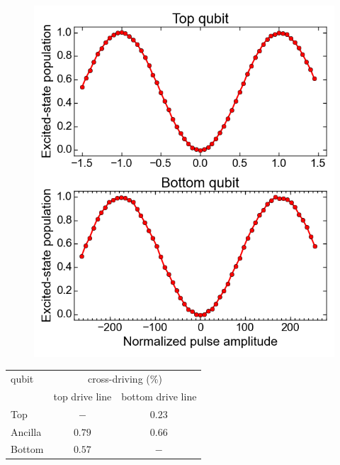       \begin{figure}[tb]
        \centering
        \includegraphics[width=.5\textwidth]{../Figures/Exploring frequency re-use/cross-driving_Rabi.png}
        \label{fig:cross-driving Rabi}
      \end{figure}
      \begin{table}
        \begin{tabular}{l c c}
          \toprule
          qubit & \multicolumn{2}{c}{cross-driving (\%)} \\
          \cmidrule(lr){2-3}
               & top drive line & bottom drive line \\
          \midrule
          Top     & $-$    & $0.23$ \\
          Ancilla & $0.79$ & $0.66$ \\
          Bottom  & $0.57$ & $-$    \\
          \bottomrule
        \end{tabular}
        \label{tab:cross-driving}
      \end{table}

